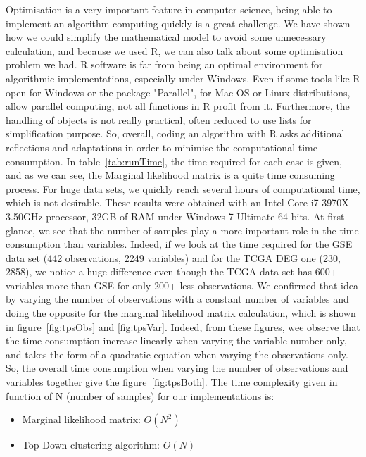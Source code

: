 \documentclass[twocolumn,12pt]{article}
\begin{document}
Optimisation is a very important feature in computer science, being able to implement an algorithm computing quickly is a great challenge.
We have shown how we could simplify the mathematical model to avoid some unnecessary calculation, and because we used R, we can also talk about some optimisation problem we had.
R software is far from being an optimal environment for algorithmic implementations, especially under Windows. Even if some tools like R open for Windows or the package "Parallel", for Mac OS or Linux distributions, allow parallel computing, not all functions in R profit from it.
Furthermore, the handling of objects is not really practical, often reduced to use lists for simplification purpose.
So, overall, coding an algorithm with R asks additional reflections and adaptations in order to minimise the computational time consumption.
In table~\ref{tab:runTime}, the time required for each case is given, and as we can see, the Marginal likelihood matrix is a quite time consuming process.
For huge data sets, we quickly reach several hours of computational time, which is not desirable.
These results were obtained with an Intel Core i7-3970X 3.50GHz processor, 32GB of RAM under Windows 7 Ultimate 64-bits.
At first glance, we see that the number of samples play a more important role in the time consumption than variables.
Indeed, if we look at the time required for the GSE data set (442 observations, 2249 variables) and for the TCGA DEG one (230, 2858), we notice a huge difference even though the TCGA data set has 600+ variables more than GSE for only 200+ less observations.
We confirmed that idea by varying the number of observations with a constant number of variables and doing the opposite for the marginal likelihood matrix calculation, which is shown in figure~\ref{fig:tpsObs} and \ref{fig:tpsVar}.
Indeed, from these figures, wee observe that the time consumption increase linearly when varying the variable number only, and takes the form of a quadratic equation when varying the observations only.
So, the overall time consumption when varying the number of observations and variables together give the figure~\ref{fig:tpsBoth}.
The time complexity given in function of N (number of samples) for our implementations is:
\begin{itemize}
    \item Marginal likelihood matrix: $O(N^2)$
    \item Top-Down clustering algorithm: $O(N)$
\end{itemize}
\end{document}
